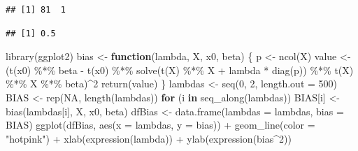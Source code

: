 \documentclass[
]{article}
\newenvironment{Shaded}{\begin{snugshade}}{\end{snugshade}}
\newcommand{\AttributeTok}[1]{\textcolor[rgb]{0.77,0.63,0.00}{#1}}
\newcommand{\ConstantTok}[1]{\textcolor[rgb]{0.00,0.00,0.00}{#1}}
\newcommand{\ControlFlowTok}[1]{\textcolor[rgb]{0.13,0.29,0.53}{\textbf{#1}}}
\newcommand{\DecValTok}[1]{\textcolor[rgb]{0.00,0.00,0.81}{#1}}
\newcommand{\FunctionTok}[1]{\textcolor[rgb]{0.00,0.00,0.00}{#1}}
\newcommand{\NormalTok}[1]{#1}
\newcommand{\OtherTok}[1]{\textcolor[rgb]{0.56,0.35,0.01}{#1}}
\newcommand{\SpecialCharTok}[1]{\textcolor[rgb]{0.00,0.00,0.00}{#1}}
\newcommand{\StringTok}[1]{\textcolor[rgb]{0.31,0.60,0.02}{#1}}
\begin{document}
\begin{verbatim}
## [1] 81  1
\end{verbatim}

\begin{Shaded}
\end{Shaded}

\begin{verbatim}
## [1] 0.5
\end{verbatim}

\begin{Shaded}
\begin{Highlighting}[]
\FunctionTok{library}\NormalTok{(ggplot2)}
\NormalTok{bias }\OtherTok{\textless{}{-}} \ControlFlowTok{function}\NormalTok{(lambda, X, x0, beta) \{}
\NormalTok{  p }\OtherTok{\textless{}{-}} \FunctionTok{ncol}\NormalTok{(X)}
\NormalTok{  value }\OtherTok{\textless{}{-}}\NormalTok{ (}\FunctionTok{t}\NormalTok{(x0) }\SpecialCharTok{\%*\%}\NormalTok{ beta }\SpecialCharTok{{-}} \FunctionTok{t}\NormalTok{(x0) }\SpecialCharTok{\%*\%} \FunctionTok{solve}\NormalTok{(}\FunctionTok{t}\NormalTok{(X) }\SpecialCharTok{\%*\%}\NormalTok{ X }\SpecialCharTok{+}\NormalTok{ lambda }\SpecialCharTok{*} \FunctionTok{diag}\NormalTok{(p)) }\SpecialCharTok{\%*\%} \FunctionTok{t}\NormalTok{(X) }\SpecialCharTok{\%*\%}\NormalTok{ X }\SpecialCharTok{\%*\%}\NormalTok{ beta)}\SpecialCharTok{\^{}}\DecValTok{2}
  \FunctionTok{return}\NormalTok{(value)}
\NormalTok{\}}
\NormalTok{lambdas }\OtherTok{\textless{}{-}} \FunctionTok{seq}\NormalTok{(}\DecValTok{0}\NormalTok{, }\DecValTok{2}\NormalTok{, }\AttributeTok{length.out =} \DecValTok{500}\NormalTok{)}
\NormalTok{BIAS }\OtherTok{\textless{}{-}} \FunctionTok{rep}\NormalTok{(}\ConstantTok{NA}\NormalTok{, }\FunctionTok{length}\NormalTok{(lambdas))}
\ControlFlowTok{for}\NormalTok{ (i }\ControlFlowTok{in} \FunctionTok{seq\_along}\NormalTok{(lambdas)) BIAS[i] }\OtherTok{\textless{}{-}} \FunctionTok{bias}\NormalTok{(lambdas[i], X, x0, beta)}
\NormalTok{dfBias }\OtherTok{\textless{}{-}} \FunctionTok{data.frame}\NormalTok{(}\AttributeTok{lambdas =}\NormalTok{ lambdas, }\AttributeTok{bias =}\NormalTok{ BIAS)}
\FunctionTok{ggplot}\NormalTok{(dfBias, }\FunctionTok{aes}\NormalTok{(}\AttributeTok{x =}\NormalTok{ lambdas, }\AttributeTok{y =}\NormalTok{ bias)) }\SpecialCharTok{+}
  \FunctionTok{geom\_line}\NormalTok{(}\AttributeTok{color =} \StringTok{"hotpink"}\NormalTok{) }\SpecialCharTok{+}
  \FunctionTok{xlab}\NormalTok{(}\FunctionTok{expression}\NormalTok{(lambda)) }\SpecialCharTok{+}
  \FunctionTok{ylab}\NormalTok{(}\FunctionTok{expression}\NormalTok{(bias}\SpecialCharTok{\^{}}\DecValTok{2}\NormalTok{))}
\end{Highlighting}
\end{Shaded}
\end{document}
